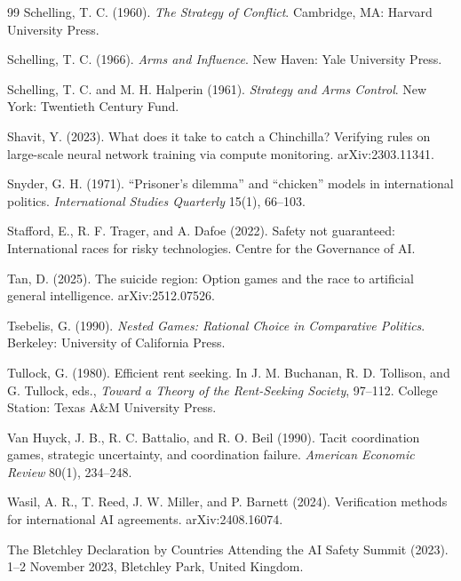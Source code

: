 \documentclass[11pt]{article}
\theoremstyle{plain}
\theoremstyle{definition}
\theoremstyle{remark}
\begin{document}
\begin{thebibliography}{99}
 Schelling, T. C. (1960). \emph{The Strategy of Conflict}. Cambridge, MA: Harvard University Press.

 Schelling, T. C. (1966). \emph{Arms and Influence}. New Haven: Yale University Press.

 Schelling, T. C. and M. H. Halperin (1961). \emph{Strategy and Arms Control}. New York: Twentieth Century Fund.

 Shavit, Y. (2023). What does it take to catch a Chinchilla? Verifying rules on large-scale neural network training via compute monitoring. arXiv:2303.11341.

 Snyder, G. H. (1971). ``Prisoner's dilemma'' and ``chicken'' models in international politics. \emph{International Studies Quarterly} 15(1), 66--103.

 Stafford, E., R. F. Trager, and A. Dafoe (2022). Safety not guaranteed: International races for risky technologies. Centre for the Governance of AI.

 Tan, D. (2025). The suicide region: Option games and the race to artificial general intelligence. arXiv:2512.07526.

 Tsebelis, G. (1990). \emph{Nested Games: Rational Choice in Comparative Politics}. Berkeley: University of California Press.

 Tullock, G. (1980). Efficient rent seeking. In J. M. Buchanan, R. D. Tollison, and G. Tullock, eds., \emph{Toward a Theory of the Rent-Seeking Society}, 97--112. College Station: Texas A\&M University Press.

 Van Huyck, J. B., R. C. Battalio, and R. O. Beil (1990). Tacit coordination games, strategic uncertainty, and coordination failure. \emph{American Economic Review} 80(1), 234--248.

 Wasil, A. R., T. Reed, J. W. Miller, and P. Barnett (2024). Verification methods for international AI agreements. arXiv:2408.16074.


 The Bletchley Declaration by Countries Attending the AI Safety Summit (2023). 1--2 November 2023, Bletchley Park, United Kingdom.


\end{thebibliography}
\end{document}
